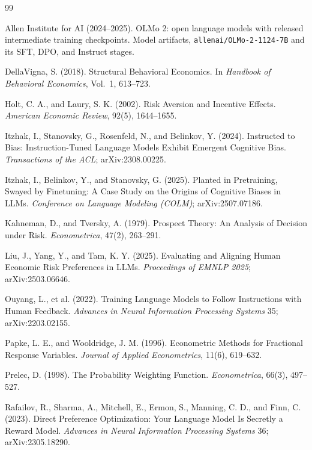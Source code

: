\documentclass[11pt]{article}
\begin{document}
\begin{thebibliography}{99}
\small

Allen Institute for AI (2024--2025).
OLMo 2: open language models with released intermediate training checkpoints.
Model artifacts, \texttt{allenai/OLMo-2-1124-7B} and its SFT, DPO, and Instruct stages.

DellaVigna, S. (2018).
Structural Behavioral Economics. In \textit{Handbook of Behavioral Economics}, Vol.~1, 613--723.

Holt, C. A., and Laury, S. K. (2002).
Risk Aversion and Incentive Effects. \textit{American Economic Review}, 92(5), 1644--1655.

Itzhak, I., Stanovsky, G., Rosenfeld, N., and Belinkov, Y. (2024).
Instructed to Bias: Instruction-Tuned Language Models Exhibit Emergent Cognitive Bias.
\textit{Transactions of the ACL}; arXiv:2308.00225.

Itzhak, I., Belinkov, Y., and Stanovsky, G. (2025).
Planted in Pretraining, Swayed by Finetuning: A Case Study on the Origins of Cognitive Biases in LLMs.
\textit{Conference on Language Modeling (COLM)}; arXiv:2507.07186.

Kahneman, D., and Tversky, A. (1979).
Prospect Theory: An Analysis of Decision under Risk. \textit{Econometrica}, 47(2), 263--291.

Liu, J., Yang, Y., and Tam, K. Y. (2025).
Evaluating and Aligning Human Economic Risk Preferences in LLMs.
\textit{Proceedings of EMNLP 2025}; arXiv:2503.06646.

Ouyang, L., et al. (2022).
Training Language Models to Follow Instructions with Human Feedback.
\textit{Advances in Neural Information Processing Systems} 35; arXiv:2203.02155.

Papke, L. E., and Wooldridge, J. M. (1996).
Econometric Methods for Fractional Response Variables. \textit{Journal of Applied Econometrics},
11(6), 619--632.

Prelec, D. (1998).
The Probability Weighting Function. \textit{Econometrica}, 66(3), 497--527.

Rafailov, R., Sharma, A., Mitchell, E., Ermon, S., Manning, C. D., and Finn, C. (2023).
Direct Preference Optimization: Your Language Model Is Secretly a Reward Model.
\textit{Advances in Neural Information Processing Systems} 36; arXiv:2305.18290.


\end{thebibliography}
\end{document}
